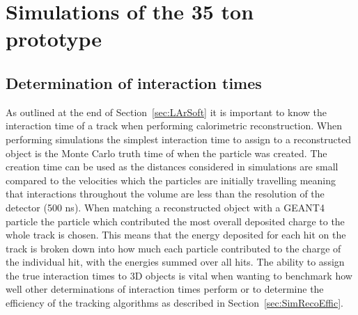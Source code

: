 

\chapter{Simulations of the 35 ton prototype}  %

\graphicspath{{35tonSimulation/Figs/PDF/}{35tonSimulation/Figs/Raster/}{35tonSimulation/Figs/}}

\section{Determination of interaction times} \label{sec:SimInteractionTimes} %
As outlined at the end of Section~\ref{sec:LArSoft} it is important to know the interaction time of a track when performing calorimetric reconstruction. When performing simulations the simplest interaction time to assign to a reconstructed object is the Monte Carlo truth time of when the particle was created. The creation time can be used as the distances considered in simulations are small compared to the velocities which the particles are initially travelling meaning that interactions throughout the volume are less than the resolution of the detector (500 ns). When matching a reconstructed object with a GEANT4 particle the particle which contributed the most overall deposited charge to the whole track is chosen. This means that the energy deposited for each hit on the track is broken down into how much each particle contributed to the charge of the individual hit, with the energies summed over all hits. The ability to assign the true interaction times to 3D objects is vital when wanting to benchmark how well other determinations of interaction times perform or to determine the efficiency of the tracking algorithms as described in Section~\ref{sec:SimRecoEffic}. \\

